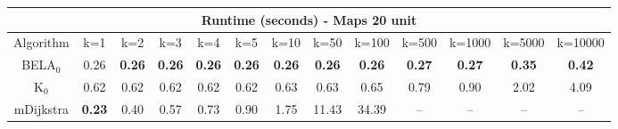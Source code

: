 \begin{tabular}{c|cccccccccccc}\toprule
\multicolumn{13}{c}{Runtime (seconds) - Maps 20 unit}\\ \midrule
Algorithm & k=1 & k=2 & k=3 & k=4 & k=5 & k=10 & k=50 & k=100 & k=500 & k=1000 & k=5000 & k=10000 \\ \midrule
BELA$_0$ & 0.26 & \textbf{0.26} & \textbf{0.26} & \textbf{0.26} & \textbf{0.26} & \textbf{0.26} & \textbf{0.26} & \textbf{0.26} & \textbf{0.27} & \textbf{0.27} & \textbf{0.35} & \textbf{0.42} \\
K$_0$ & 0.62 & 0.62 & 0.62 & 0.62 & 0.62 & 0.63 & 0.63 & 0.65 & 0.79 & 0.90 & 2.02 & 4.09 \\
mDijkstra & \textbf{0.23} & 0.40 & 0.57 & 0.73 & 0.90 & 1.75 & 11.43 & 34.39 & -- & -- & -- & -- \\ \bottomrule 
\end{tabular}
